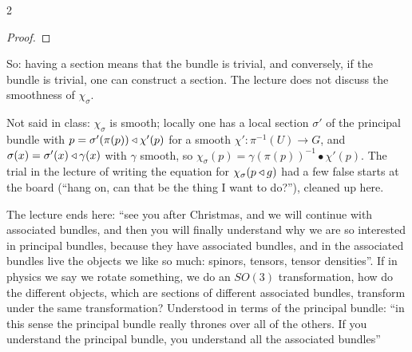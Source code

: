 \begin{paracol}{2}
\begin{proof}
\end{proof}
So: having a section means that the bundle is trivial, and conversely, if the bundle is trivial, one can construct a section. The lecture does not discuss the smoothness of $\chi_\sigma$.
\begin{coursenote}
Not said in class: $\chi_\sigma$ is smooth; locally one has a local section $\sigma'$ of the principal bundle with $p=\sigma'(\pi(p))\mathbin{\triangleleft}\chi'(p)$ for a smooth $\chi'\colon\pi^{-1}(U)\to G$, and $\sigma(x)=\sigma'(x)\mathbin{\triangleleft}\gamma(x)$ with $\gamma$ smooth, so $\chi_\sigma(p)=\gamma(\pi(p))^{-1}\bullet\chi'(p)$. The trial in the lecture of writing the equation for $\chi_\sigma(p\mathbin{\triangleleft} g)$ had a few false starts at the board (``hang on, can that be the thing I want to do?''), cleaned up here.  
\end{coursenote}
\begin{aside}
The lecture ends here: ``see you after Christmas, and we will continue with associated bundles, and then you will finally understand why we are so interested in principal bundles, because they have associated bundles, and in the associated bundles live the objects we like so much: spinors, tensors, tensor densities''. If in physics we say we rotate something, we do an $SO(3)$ transformation, how do the different objects, which are sections of different associated bundles, transform under the same transformation? Understood in terms of the principal bundle: ``in this sense the principal bundle really thrones over all of the others. If you understand the principal bundle, you understand all the associated bundles''    
\end{aside}


\end{paracol}
